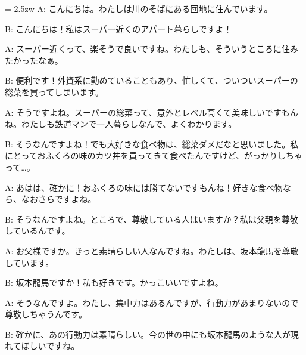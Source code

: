 \documentclass[11pt]{amsart}
\title{}
\author{}
\newenvironment{hangall}[1]{\hangindent = 2.5zw\everypar{\hangindent = 2.5zw}}{}
\begin{document}
\maketitle
\begin{hangall}{}%
A: こんにちは。わたしは川のそばにある団地に住んでいます。

B: こんにちは！私はスーパー近くのアパート暮らしですよ！

A: スーパー近くって、楽そうで良いですね。わたしも、そういうところに住みたかったなぁ。

B: 便利です！外資系に勤めていることもあり、忙しくて、ついついスーパーの総菜を買ってしまいます。

A: そうですよね。スーパーの総菜って、意外とレベル高くて美味しいですもんね。わたしも鉄道マンで一人暮らしなんで、よくわかります。

B: そうなんですよね！でも大好きな食べ物は、総菜ダメだなと思いました。私にとっておふくろの味のカツ丼を買ってきて食べたんですけど、がっかりしちゃって…。

A: あはは、確かに！おふくろの味には勝てないですもんね！好きな食べ物なら、なおさらですよね。

B: そうなんですよね。ところで、尊敬している人はいますか？私は父親を尊敬しているんです。

A: お父様ですか。きっと素晴らしい人なんですね。わたしは、坂本龍馬を尊敬しています。

B: 坂本龍馬ですか！私も好きです。かっこいいですよね。

A: そうなんですよ。わたし、集中力はあるんですが、行動力があまりないので尊敬しちゃうんです。

B: 確かに、あの行動力は素晴らしい。今の世の中にも坂本龍馬のような人が現れてほしいですね。
\end{hangall}
\end{document}
